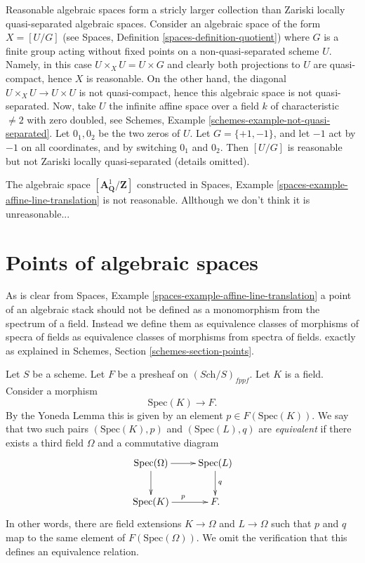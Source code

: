 \begin{remark}
\label{remark-reasonable-Zariski-locally-quasi-separated}
Reasonable algebraic spaces form a stricly larger collection than
Zariski locally quasi-separated algebraic spaces. Consider
an algebraic space of the form $X = [U/G]$ (see
Spaces, Definition \ref{spaces-definition-quotient})
where $G$ is a finite group acting without fixed points on a
non-quasi-separated scheme $U$. Namely, in this case
$U \times_X U = U \times G$ and clearly both projections to $U$ are
quasi-compact, hence $X$ is reasonable. On the other hand, the diagonal
$U \times_X U \to U \times U$ is not quasi-compact, hence this
algebraic space is not quasi-separated. Now, take $U$ the infinite
affine space over a field $k$ of characteristic $\not = 2$ with
zero doubled, see
Schemes, Example \ref{schemes-example-not-quasi-separated}.
Let $0_1, 0_2$ be the two zeros of $U$. Let $G = \{+1, -1\}$, and
let $-1$ act by $-1$ on all coordinates, and by switching
$0_1$ and $0_2$. Then $[U/G]$ is reasonable but not Zariski locally
quasi-separated (details omitted).
\end{remark}

\begin{example}
\label{example-not-reasonable}
The algebraic space $[\mathbf{A}^1_{\mathbf{Q}}/\mathbf{Z}]$ constructed in
Spaces, Example \ref{spaces-example-affine-line-translation}
is not reasonable. Allthough we don't think it is unreasonable...
\end{example}




\section{Points of algebraic spaces}
\label{section-points}

\noindent
As is clear from Spaces, Example \ref{spaces-example-affine-line-translation}
a point of an algebraic stack should not be defined as a monomorphism
from the spectrum of a field.
Instead we define them as equivalence classes of morphisms of specra
of fields as equivalence classes of morphisms from spectra of fields.
exactly as explained in Schemes, Section \ref{schemes-section-points}.

\medskip\noindent
Let $S$ be a scheme.
Let $F$ be a presheaf on $(\textit{Sch}/S)_{fppf}$.
Let $K$ is a field. Consider a morphism
$$
\text{Spec}(K) \longrightarrow F.
$$
By the Yoneda Lemma this is given by an
element $p \in F(\text{Spec}(K))$. We say that two such
pairs $(\text{Spec}(K), p)$ and $(\text{Spec}(L), q)$
are {\it equivalent} if there exists
a third field $\Omega$ and a commutative diagram
$$
\xymatrix{
\text{Spec}(\Omega) \ar[r] \ar[d] &
\text{Spec}(L) \ar[d]^q \\
\text{Spec}(K) \ar[r]^p &
F.
}
$$
In other words, there are field extensions
$K \to \Omega$ and $L \to \Omega$ such that
$p$ and $q$ map to the same element
of $F(\text{Spec}(\Omega))$. We omit the verification that this
defines an equivalence relation.

